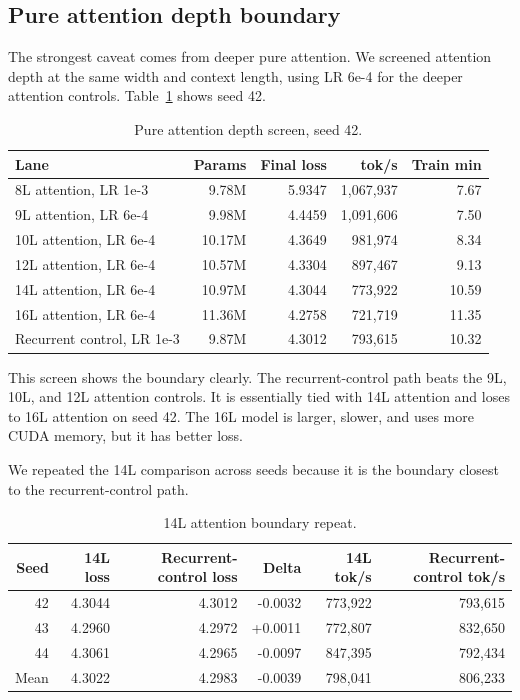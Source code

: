 \documentclass[11pt]{article}
\begin{document}
\subsection{Pure attention depth boundary}

The strongest caveat comes from deeper pure attention. We screened attention
depth at the same width and context length, using LR 6e-4 for the deeper
attention controls. Table~\ref{tab:depth} shows seed 42.

\begin{table}[h]
\centering
\caption{Pure attention depth screen, seed 42.}
\label{tab:depth}
\begin{tabular}{lrrrr}
\toprule
Lane & Params & Final loss & tok/s & Train min \\
\midrule
8L attention, LR 1e-3 & 9.78M & 5.9347 & 1,067,937 & 7.67 \\
9L attention, LR 6e-4 & 9.98M & 4.4459 & 1,091,606 & 7.50 \\
10L attention, LR 6e-4 & 10.17M & 4.3649 & 981,974 & 8.34 \\
12L attention, LR 6e-4 & 10.57M & 4.3304 & 897,467 & 9.13 \\
14L attention, LR 6e-4 & 10.97M & 4.3044 & 773,922 & 10.59 \\
16L attention, LR 6e-4 & 11.36M & 4.2758 & 721,719 & 11.35 \\
Recurrent control, LR 1e-3 & 9.87M & 4.3012 & 793,615 & 10.32 \\
\bottomrule
\end{tabular}
\end{table}

This screen shows the boundary clearly. The recurrent-control path beats the 9L, 10L, and
12L attention controls. It is essentially tied with 14L attention and loses to
16L attention on seed 42. The 16L model is larger, slower, and uses more CUDA
memory, but it has better loss.

We repeated the 14L comparison across seeds because it is the boundary closest
to the recurrent-control path.

\begin{table}[h]
\centering
\caption{14L attention boundary repeat.}
\label{tab:14l}
\begin{tabular}{rrrrrr}
\toprule
Seed & 14L loss & Recurrent-control loss & Delta & 14L tok/s & Recurrent-control tok/s \\
\midrule
42 & 4.3044 & 4.3012 & -0.0032 & 773,922 & 793,615 \\
43 & 4.2960 & 4.2972 & +0.0011 & 772,807 & 832,650 \\
44 & 4.3061 & 4.2965 & -0.0097 & 847,395 & 792,434 \\
\midrule
Mean & 4.3022 & 4.2983 & -0.0039 & 798,041 & 806,233 \\
\bottomrule
\end{tabular}
\end{table}
\end{document}
